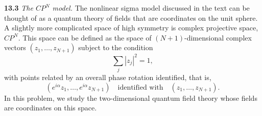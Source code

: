 \textbf{13.3} \emph{The $CP^N$ model.}  The nonlinear sigma model discussed in
the text can be thought of as a quantum theory of fields that are coordinates
on the unit sphere.  A slightly more complicated space of high symmetry is
complex projective space, $CP^N$.  This space can be defined as the space of
$(N+1)$-dimensional complex vectors $(z_1, \ldots, z_{N+1})$ subject to the
condition
\begin{equation}
  \sum_j |z_j|^2 = 1 ,
\end{equation}
with points related by an overall phase rotation identified, that is,
\begin{equation}
  (e^{i\alpha}z_1, \ldots, e^{i\alpha}z_{N+1}) \quad
  \text{identified with} \quad (z_1, \ldots, z_{N+1}) .
\end{equation}
In this problem, we study the two-dimensional quantum field theory whose
fields are coordinates on this space.
